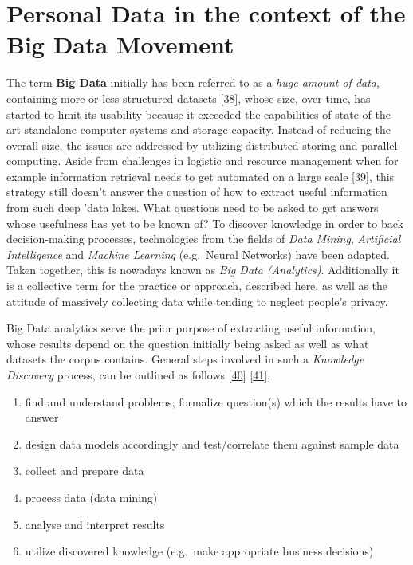 \documentclass[12pt,english,a4paper,titlepage,cleardoublepage=empty,dottedtoc]{report}
\providecommand{\tightlist}{%
  \setlength{\itemsep}{0pt}\setlength{\parskip}{0pt}}
\begin{document}
\hypertarget{personal-data-in-the-context-of-the-big-data-movement}{\section{Personal
Data in the context of the Big Data
Movement}\label{personal-data-in-the-context-of-the-big-data-movement}}

The term \textbf{\protect\hypertarget{def--big-data}{}{Big Data}}
initially has been referred to as a \emph{huge amount of data},
containing more or less structured datasets
{[}\protect\hyperlink{ref-web_2016_oxford_definition_big-data}{38}{]},
whose size, over time, has started to limit its usability because it
exceeded the capabilities of state-of-the-art standalone computer
systems and storage-capacity. Instead of reducing the overall size, the
issues are addressed by utilizing distributed storing and parallel
computing. Aside from challenges in logistic and resource management
when for example information retrieval needs to get automated on a large
scale
{[}\protect\hyperlink{ref-web_2016_wikipedia_definition_big-data}{39}{]},
this strategy still doesn't answer the question of how to extract useful
information from such deep 'data lakes. What questions need to be asked
to get answers whose usefulness has yet to be known of? To discover
knowledge in order to back decision-making processes, technologies from
the fields of \emph{Data Mining}, \emph{Artificial Intelligence} and
\emph{Machine Learning} (e.g.~Neural Networks) have been adapted. Taken
together, this is nowadays known as \emph{Big Data (Analytics)}.
Additionally it is a collective term for the practice or approach,
described here, as well as the attitude of massively collecting data
while tending to neglect people's privacy.

Big Data analytics serve the prior purpose of extracting useful
information, whose results depend on the question initially being asked
as well as what datasets the corpus contains. General steps involved in
such a \emph{Knowledge Discovery} process, can be outlined as follows
{[}\protect\hyperlink{ref-chapter_2007_the-knowledge-discovery-process}{40}{]}
{[}\protect\hyperlink{ref-paper_2009_a-data-mining-knowledge-discovery-process-model}{41}{]},

\begin{enumerate}
\def\labelenumi{\arabic{enumi}.}
\tightlist
\item
  find and understand problems; formalize question(s) which the results
  have to answer
\item
  design data models accordingly and test/correlate them against sample
  data
\item
  collect and prepare data
\item
  process data (data mining)
\item
  analyse and interpret results
\item
  utilize discovered knowledge (e.g.~make appropriate business
  decisions)
\end{enumerate}
\end{document}
